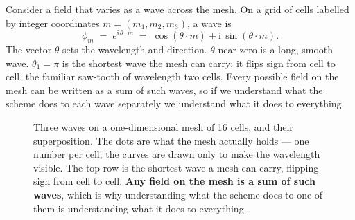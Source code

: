 \documentclass[11pt,a4paper]{article}
\begin{document}
Consider a field that varies as a wave across the mesh. On a grid of cells labelled by
integer coordinates $m = (m_1,m_2,m_3)$, a wave is
\begin{equation}
  \phi_m \;=\; e^{\mathrm{i}\,\theta \cdot m}
  \;=\; \cos(\theta\cdot m) + \mathrm{i}\,\sin(\theta\cdot m).
\end{equation}
The vector $\theta$ sets the wavelength and direction. $\theta$ near zero is a long, smooth
wave. $\theta_1 = \pi$ is the shortest wave the mesh can carry: it flips sign from cell to
cell, the familiar saw-tooth of wavelength two cells. Every possible field on the mesh can be
written as a sum of such waves, so if we understand what the scheme does to each wave
separately we understand what it does to everything.

\begin{figure}[h]
\centering
{}
\caption{Three waves on a one-dimensional mesh of 16 cells, and their superposition. The dots
are what the mesh actually holds --- one number per cell; the curves are drawn only to make the
wavelength visible. The top row is the shortest wave a mesh can carry, flipping sign from cell
to cell. \textbf{Any field on the mesh is a sum of such waves}, which is why understanding what
the scheme does to one of them is understanding what it does to everything.}
\label{fig:waves}
\end{figure}
\end{document}
